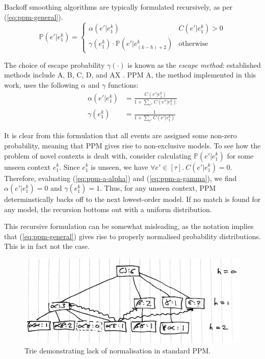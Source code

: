 \documentclass[12pt,a4paper,twoside,openright]{report}
\begin{document}
Backoff smoothing algorithms are typically formulated recursively, as per
(\ref{eq:ppm-general}).
\begin{equation}\label{eq:ppm-general}
  \mathbb{P}(e' | e_1^k) = \begin{cases}
  \alpha(e'|e_1^k) & C(e' | e_1^k) > 0 \\
\gamma(e_1^k) \cdot \mathbb{P}(e' | e_{(k - \hbar) + 2}^k) & \text{otherwise}
\end{cases} 
\end{equation} 

The choice of escape probability $\gamma(\cdot)$ is known
as the \emph{escape method}: established methods include A, B, C, D, and AX
\cite{pearce2004improved}. PPM A, the method implemented in this work, uses the
following $\alpha$ and $\gamma$ functions:
\begin{align}
  \label{eq:ppm-a-alpha}
  \alpha(e' | e_1^k) &= \frac{ C(e' | e_1^k) }{ 1 + \sum_{e''} C(e'' | e_1^k) }
  \\
  \gamma(e_1^k) &= \frac{ 1 }{ 1 + \sum_{e'} C(e' | e_1^k) }
  \label{eq:ppm-a-gamma}
\end{align}

It is clear from this formulation that all events are assigned some non-zero
probability, meaning that PPM gives rise to non-exclusive models. To see how the
problem of novel contexts is dealt with, consider calculating $\mathbb{P}(e' |
e_1^k)$ for some unseen context $e_1^k$. Since $e_1^k$ is unseen, we have
$\forall e' \in [\tau].\ C(e' | e_1^k) = 0$. Therefore, evaluating
(\ref{eq:ppm-a-alpha}) and (\ref{eq:ppm-a-gamma}), we find $\alpha(e'|e_1^k) =
0$ and $\gamma(e_1^k) = 1$. Thus, for any unseen context, PPM determinstically
backs off to the next lowest-order model. If no match is found for any model,
the recursion bottoms out with a uniform distribution. 

This recursive formulation can be somewhat misleading, as the notation implies
that (\ref{eq:ppm-general}) gives rise to properly normalised probability
distributions. This is in fact not the case. 

\begin{figure}[H]
\centering
\includegraphics[width=400pt]{figs/problematic_trie_tmp.jpg}
\caption{Trie demonstrating lack of normalisation in standard PPM.}
\label{fig:bad-ppm-trie}
\end{figure}
\end{document}
